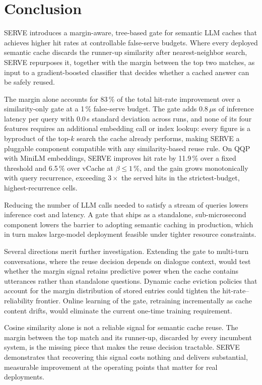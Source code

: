 \section{Conclusion}

SERVE introduces a margin-aware, tree-based gate for semantic LLM caches
that achieves higher hit rates at controllable false-serve budgets. Where
every deployed semantic cache discards the runner-up similarity after
nearest-neighbor search, SERVE repurposes it, together with the margin
between the top two matches, as input to a gradient-boosted classifier
that decides whether a cached answer can be safely reused.

The margin alone accounts for 83\,\% of the total hit-rate improvement
over a similarity-only gate at a 1\,\% false-serve budget.
The gate adds 0.8\,$\mu$s of inference latency per query with 0.0\,\textmu s standard deviation across runs, and none of its four features requires
an additional embedding call or index lookup: every figure is a byproduct
of the top-$k$ search the cache already performs, making SERVE a pluggable
component compatible with any similarity-based reuse rule.
On QQP with MiniLM embeddings, SERVE improves hit rate by 11.9\,\% over a
fixed threshold and 6.5\,\% over vCache at $\beta \le 1\,\%$, and the
gain grows monotonically with query recurrence, exceeding $3\times$ the
served hits in the strictest-budget, highest-recurrence cells.

Reducing the number of LLM calls needed to satisfy a stream of queries
lowers inference cost and latency. A gate that ships as a standalone,
sub-microsecond component lowers the barrier to adopting semantic caching
in production, which in turn makes large-model deployment feasible under
tighter resource constraints.

Several directions merit further investigation. Extending the gate to
multi-turn conversations, where the reuse decision depends on dialogue
context, would test whether the margin signal retains predictive power
when the cache contains utterances rather than standalone questions.
Dynamic cache eviction policies that account for the margin distribution
of stored entries could tighten the hit-rate--reliability frontier.
Online learning of the gate, retraining incrementally as cache content
drifts, would eliminate the current one-time training requirement.

Cosine similarity alone is not a reliable signal for semantic cache
reuse. The margin between the top match and its runner-up, discarded by
every incumbent system, is the missing piece that makes the reuse
decision tractable. SERVE demonstrates that recovering this signal costs
nothing and delivers substantial, measurable improvement at the operating
points that matter for real deployments.
